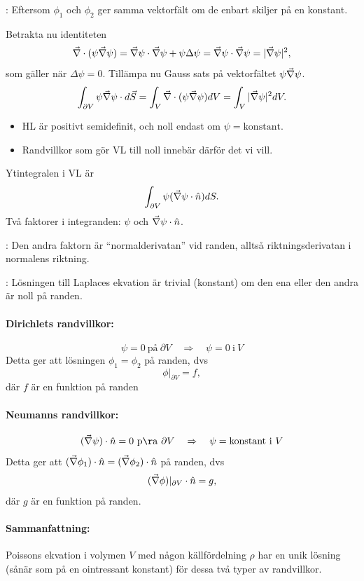\documentclass[%
oneside,                 %
final,                   %
10pt]{article}
\newcommand{\shortinlinecomment}[3]{{\color{red}{\bf #1}: #2}}
\begin{document}
\noindent
\shortinlinecomment{Kommentar 3}{ Eftersom $\phi_1$ och $\phi_2$ ger samma vektorfält om de enbart skiljer på en konstant. }{ Eftersom $\phi_1$ och $\phi_2$ }

Betrakta nu identiteten
$$
\vec{\nabla}\cdot(\psi\vec{\nabla}\psi)=\vec{\nabla}\psi\cdot\vec{\nabla}\psi+\psi\Delta\psi
=\vec{\nabla}\psi\cdot\vec{\nabla}\psi=|\vec{\nabla}\psi|^2,
$$
som gäller när $\Delta\psi=0$. Tillämpa nu Gauss sats på vektorfältet $\psi\vec{\nabla}\psi$. 
$$
\int_{\partial V}\psi\vec{\nabla}\psi\cdot d\vec S = \int_V \vec{\nabla}\cdot(\psi\vec{\nabla}\psi) dV = \int_V|\vec{\nabla}\psi|^2dV.
$$
\begin{itemize}
\item HL är positivt semidefinit, och noll endast om $\psi = \mathrm{konstant}$. 

\item Randvillkor som gör VL till noll innebär därför det vi vill.
\end{itemize}

\noindent
Ytintegralen i VL är 
$$
\int_{\partial V}\psi(\vec{\nabla}\psi\cdot\hat n)dS.
$$ 
Två faktorer i integranden: $\psi$ och $\vec{\nabla}\psi\cdot\hat n$. 

\shortinlinecomment{Kommentar 4}{ Den andra faktorn är ``normalderivatan'' vid randen, alltså riktningsderivatan i normalens riktning. }{ Den andra faktorn är }

\shortinlinecomment{Kommentar 5}{ Lösningen till Laplaces ekvation är trivial (konstant) om den ena eller den andra är noll på randen. }{ Lösningen till Laplaces ekvation }

\paragraph{Dirichlets randvillkor:}
$$
\psi = 0 \mathrm{~på~} \partial V \quad \Rightarrow \quad \psi = 0 \mathrm{~i~} V
$$
Detta ger att lösningen $\phi_1 = \phi_2$ på randen, dvs
$$
\phi|_{\partial V}=f,
$$
där $f$ är en funktion på randen

\paragraph{Neumanns randvillkor:}
$$
(\vnabla\psi) \cdot \hat n=0 \mathrm{~på~} \partial V \quad \Rightarrow \quad \psi = \mathrm{konstant} \mathrm{~i~} V
$$
Detta ger att $(\vec{\nabla}\phi_1) \cdot \hat n=(\vec{\nabla}\phi_2) \cdot \hat n$ på randen, dvs
$$
(\vec{\nabla}\phi)|_{\partial V}\cdot\hat n=g,
$$
där $g$ är en funktion på randen. 

\paragraph{Sammanfattning:}
Poissons ekvation i volymen $V$ med någon källfördelning $\rho$ har en unik lösning (sånär
som på en ointressant konstant) för dessa två typer av randvillkor.


\end{document}
